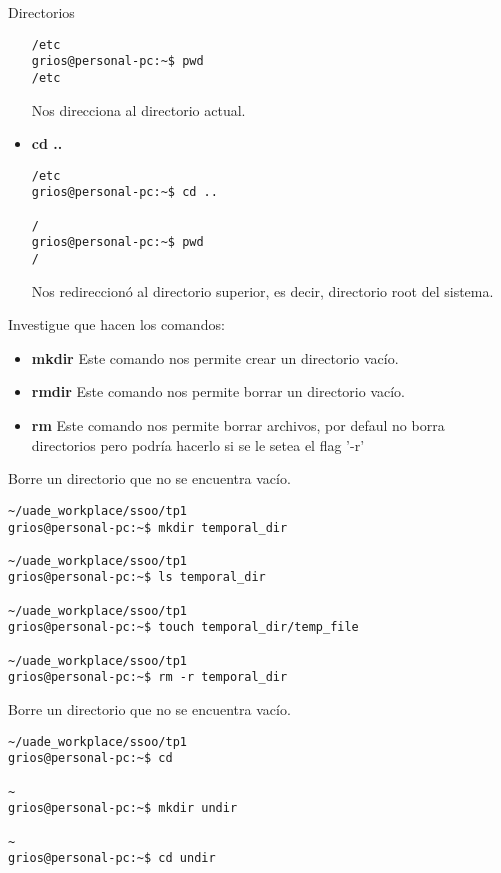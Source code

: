 \begin{section}{Directorios}
\begin{itemize}
\begin{lstlisting}[style=Ubuntu]
/etc
grios@personal-pc:~$ pwd
/etc
\end{lstlisting}
Nos direcciona al directorio actual.

\item \textbf{cd ..}
\begin{lstlisting}[style=Ubuntu]
/etc
grios@personal-pc:~$ cd ..

/
grios@personal-pc:~$ pwd
/
\end{lstlisting}
Nos redireccionó al directorio superior, es decir, directorio root del sistema.
\end{itemize}


\begin{quoting}
Investigue que hacen los comandos:
\end{quoting}

\begin{itemize}
\item \textbf{mkdir}
Este comando nos permite crear un directorio vacío.
\item \textbf{rmdir}
Este comando nos permite borrar un directorio vacío.
\item \textbf{rm}
Este comando nos permite borrar archivos, por defaul no borra directorios pero podría hacerlo si se le setea el flag '-r'
\end{itemize}


\begin{quoting}
Borre un directorio que no se encuentra vacío.
\end{quoting}
\begin{lstlisting}[style=Ubuntu]
~/uade_workplace/ssoo/tp1
grios@personal-pc:~$ mkdir temporal_dir

~/uade_workplace/ssoo/tp1
grios@personal-pc:~$ ls temporal_dir 

~/uade_workplace/ssoo/tp1
grios@personal-pc:~$ touch temporal_dir/temp_file

~/uade_workplace/ssoo/tp1
grios@personal-pc:~$ rm -r temporal_dir
\end{lstlisting}

\begin{quoting}
Borre un directorio que no se encuentra vacío.
\end{quoting}
\begin{lstlisting}[style=Ubuntu]
~/uade_workplace/ssoo/tp1
grios@personal-pc:~$ cd

~
grios@personal-pc:~$ mkdir undir

~
grios@personal-pc:~$ cd undir

\end{lstlisting}



\end{section}
